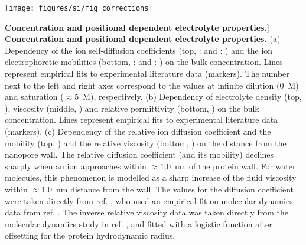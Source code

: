 
\begin{figure*}[!b]

\centering

\texttt{[image: figures/si/fig\_corrections]}

\caption
[\textbf{Concentration and positional dependent electrolyte properties.}]
{
\textbf{Concentration and positional dependent electrolyte properties.}
(a)
Dependency of the ion self-diffusion coefficients (top, :  and : 
) and the ion electrophoretic mobilities (bottom, : 
 and : ) on the bulk  
concentration. Lines represent empirical fits to experimental literature data (markers). The number next to 
the left and right axes correspond to the values at infinite dilution ($0$~M) and saturation ($\approx5$~M), 
respectively.
(b)
Dependency of electrolyte density (top, ), viscosity (middle, 
) and relative permittivity (bottom, ) on the 
bulk  concentration. Lines represent empirical fits to experimental literature data (markers).
(c)
Dependency of the relative ion diffusion coefficient and the mobility (top, ) 
and the relative viscosity (bottom, ) on the distance from the nanopore wall. 
The relative diffusion coefficient (and its mobility) declines sharply when an ion approaches within 
$\approx1.0$~nm of the protein wall. For water molecules, this phenomenon is modelled as a sharp increase of 
the fluid viscosity within $\approx1.0$~nm distance from the wall. The values for the diffusion coefficient 
were taken directly from ref. , who used an empirical fit on molecular dynamics data 
from ref. . The inverse relative viscosity data was taken directly from the molecular 
dynamics study in ref. , and fitted with a logistic function after offsetting for the 
protein hydrodynamic radius.
}

\label{fig:corrections}

\end{figure*}

